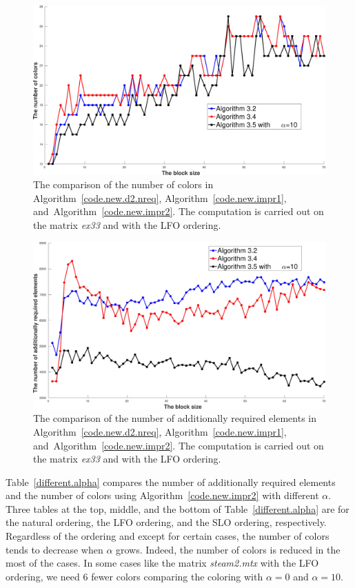 \documentclass[12pt, twoside,a4paper,toc=bibliography]{scrbook}
\newcommand{\coderef}[1]{Algorithm~\protect\ref{#1}}
\begin{document}
\begin{figure}
\centering
\includegraphics[width=0.9\linewidth]{ex33_alg31_alg32_alg34_alg35_bls_lfo_cols}
\caption{
The comparison of the number of colors in \coderef{code.new.d2.nreq},
\coderef{code.new.impr1}, and~\coderef{code.new.impr2}.
The computation is carried out on the matrix \textit{ex33} and with the LFO ordering.}
\label{ex33_alg31_alg32_alg34_alg35_bls_lfo_cols}
\end{figure}

\begin{figure}
\centering
\includegraphics[width=0.9\linewidth]{ex33_alg31_alg32_alg34_alg35_bls_lfo_adds}
\caption{
The comparison of the number of additionally required elements in \coderef{code.new.d2.nreq},
\coderef{code.new.impr1}, and~\coderef{code.new.impr2}.
The computation is carried out on the matrix \textit{ex33} and with the LFO ordering.}
\label{ex33_alg31_alg32_alg34_alg35_bls_lfo_adds}
\end{figure}

Table~\ref{different.alpha} compares the number of additionally required elements and 
the number of colors using \coderef{code.new.impr2} with different $\alpha$.
Three tables at the top, middle, and the bottom of Table~\ref{different.alpha}
are for the natural ordering, the LFO ordering, and the SLO ordering, respectively.
Regardless of the ordering and except for certain cases,
the number of colors tends to decrease when $\alpha$ grows.
Indeed, the number of colors is reduced in the most of the cases. In some cases like 
the matrix \textit{steam2.mtx} with the LFO ordering, we need $6$ fewer colors comparing 
the coloring with $\alpha=0$ and $\alpha=10$.
\end{document}
